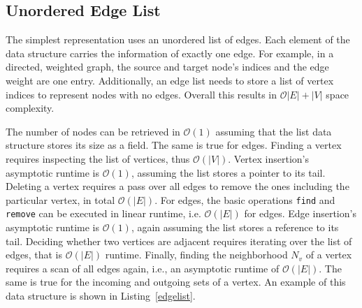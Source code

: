          \subsection{Unordered Edge List}
            The simplest representation uses an unordered list of edges. 
            Each element of the data structure carries the information of exactly one edge. 
            For example, in a directed, weighted graph, the source and target node's indices and the edge weight are one entry. 
            Additionally, an edge list needs to store a list of vertex indices to represent nodes with no edges.
            Overall this results in $\mathcal{O}|E| + |V|$ space complexity.
            
            The number of nodes can be retrieved in $\mathcal{O}(1)$ assuming that the list data structure stores its size as a field. 
            The same is true for edges.
            Finding a vertex requires inspecting the list of vertices, thus $\mathcal{O}(|V|)$. 
            Vertex insertion's asymptotic runtime is $\mathcal{O}(1)$, assuming the list stores a pointer to its tail. 
            Deleting a vertex requires a pass over all edges to remove the ones including the particular vertex, in total $\mathcal{O}(|E|)$.
            For edges, the basic operations \texttt{find} and \texttt{remove} can be executed in linear runtime, i.e. $\mathcal{O}(|E|)$ for edges.
            Edge insertion's asymptotic runtime is $\mathcal{O}(1)$, again assuming the list stores a reference to its tail. 
            Deciding whether two vertices are adjacent requires iterating over the list of edges, that is 
            $\mathcal{O}(|E|)$ runtime.
            Finally, finding the neighborhood $N_v$ of a vertex requires a scan of all edges again, i.e., an asymptotic runtime of $\mathcal{O}(|E|)$. 
            The same is true for the incoming and outgoing sets of a vertex.
            An example of this data structure is shown in Listing~\ref{edgelist}.
            
